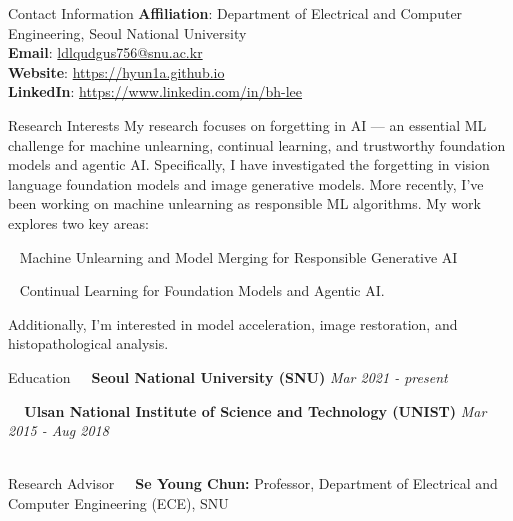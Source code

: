 \documentclass{resume} %
\begin{document}
\begin{rSection}{Contact Information}
{\bf Affiliation}: Department of Electrical and Computer Engineering, Seoul National University \\
{\bf Email}: \href{mailto:ldlqudgus756@snu.ac.kr}{ldlqudgus756@snu.ac.kr} \\
{\bf Website}: \href{https://hyun1a.github.io}{https://hyun1a.github.io} \\
{\bf LinkedIn}: \href{https://www.linkedin.com/in/bh-lee}{https://www.linkedin.com/in/bh-lee} \\
\end{rSection}


\begin{rSection}{Research Interests}
My research focuses on forgetting in AI — an essential ML challenge for machine unlearning, continual learning, and trustworthy foundation models and agentic AI. Specifically, I have investigated the forgetting in vision language foundation models and image generative models. More recently, I've been working on machine unlearning as responsible ML algorithms. My work explores two key areas:

\textbullet~\,\,Machine Unlearning and Model Merging for Responsible Generative AI

\textbullet~\,\,Continual Learning for Foundation Models and Agentic AI.

Additionally, I’m interested in model acceleration, image restoration, and histopathological analysis. \\
\end{rSection}




\begin{rSection}{Education}
\textbullet~\,\, {\bf Seoul National University (SNU)} \hfill {\it Mar 2021 - present}
\\\hspace*{1.5em}{Combined M.S./Ph.D Program in Electrical and Computer Engineering (ECE)} 

\textbullet~\,\, {\bf Ulsan National Institute of Science and Technology (UNIST)} \hfill {\it Mar 2015 - Aug 2018}
\\\hspace*{1.5em}{B.S. in Electical Engineering, GPA: 4.04/4.30}\\

\end{rSection}
\begin{rSection}{Research Advisor}
\textbullet~\,\,\,\,{\bf Se Young Chun:}{ Professor, Department of Electrical and Computer Engineering (ECE), SNU} \\
\end{rSection}
\end{document}
